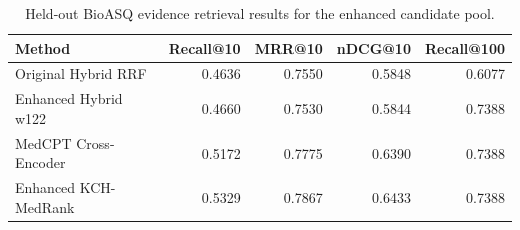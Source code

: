 \begin{table}[t]
\centering
\small
\caption{Held-out BioASQ evidence retrieval results for the enhanced candidate pool.}
\label{tab:enhanced-bioasq-main-results}
\begin{tabular}{lrrrr}
\toprule
Method & Recall@10 & MRR@10 & nDCG@10 & Recall@100 \\
\midrule
Original Hybrid RRF & 0.4636 & 0.7550 & 0.5848 & 0.6077 \\
Enhanced Hybrid w122 & 0.4660 & 0.7530 & 0.5844 & 0.7388 \\
MedCPT Cross-Encoder & 0.5172 & 0.7775 & 0.6390 & 0.7388 \\
Enhanced KCH-MedRank & 0.5329 & 0.7867 & 0.6433 & 0.7388 \\
\bottomrule
\end{tabular}
\end{table}
